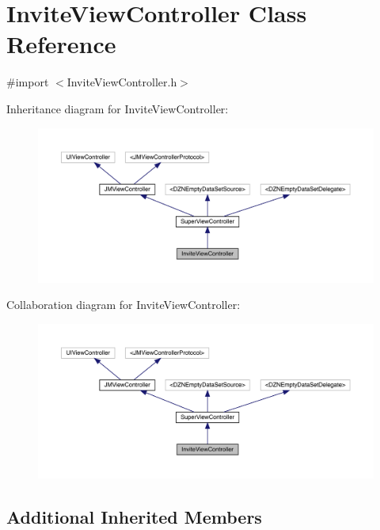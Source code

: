 \hypertarget{interface_invite_view_controller}{}\section{Invite\+View\+Controller Class Reference}
\label{interface_invite_view_controller}


{\ttfamily \#import $<$Invite\+View\+Controller.\+h$>$}



Inheritance diagram for Invite\+View\+Controller\+:\nopagebreak
\begin{figure}[H]
\begin{center}
\leavevmode
\includegraphics[width=350pt]{interface_invite_view_controller__inherit__graph}
\end{center}
\end{figure}


Collaboration diagram for Invite\+View\+Controller\+:\nopagebreak
\begin{figure}[H]
\begin{center}
\leavevmode
\includegraphics[width=350pt]{interface_invite_view_controller__coll__graph}
\end{center}
\end{figure}
\subsection*{Additional Inherited Members}


